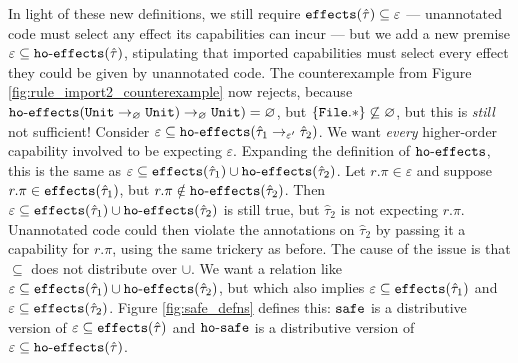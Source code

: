 In light of these new definitions, we still require $\mathtt{effects}(\hat \tau) \subseteq \varepsilon$ --- unannotated code must select any effect its capabilities can incur --- but we add a new premise $\varepsilon \subseteq \mathtt{ho \hbox{-} effects}(\hat \tau)$, stipulating that imported capabilities must select every effect they could be given by unannotated code. The counterexample from Figure \ref{fig:rule_import2_counterexample} now rejects, because $\mathtt{ho \hbox{-} effects}(\mathtt{Unit} \rightarrow_{\varnothing} \mathtt{Unit}) \rightarrow_{\varnothing} \mathtt{Unit}) = \varnothing$, but $\{ \mathtt{File.*} \} \not\subseteq \varnothing$, but this is \textit{still} not sufficient! Consider $\varepsilon \subseteq \mathtt{ho \hbox{-} effects}( \hat \tau_1 \rightarrow_{\varepsilon'} \hat \tau_2 )$. We want \textit{every} higher-order capability involved to be expecting $\varepsilon$. Expanding the definition of $\mathtt{ho \hbox{-} effects}$, this is the same as $\varepsilon \subseteq \mathtt{effects}(\hat \tau_1) \cup \mathtt{ho \hbox{-} effects}(\hat \tau_2)$. Let $r.\pi \in \varepsilon$ and suppose $r.\pi \in \mathtt{effects}(\hat \tau_1)$, but $r.\pi \notin \mathtt{ho \hbox{-} effects}(\hat \tau_2)$. Then $\varepsilon \subseteq \mathtt{effects}(\hat \tau_1) \cup \mathtt{ho \hbox{-} effects}(\hat \tau_2)$ is still true, but $\hat \tau_2$ is not expecting $r.\pi$. Unannotated code could then violate the annotations on $\hat \tau_2$ by passing it a capability for $r.\pi$, using the same trickery as before. The cause of the issue is that $\subseteq$ does not distribute over $\cup$. We want a relation like $\varepsilon \subseteq \mathtt{effects}(\hat \tau_1) \cup \mathtt{ho \hbox{-} effects}(\hat \tau_2)$, but which also implies $\varepsilon \subseteq \mathtt{effects}(\hat \tau_1)$ and $\varepsilon \subseteq \mathtt{effects}(\hat \tau_2)$. Figure \ref{fig:safe_defns} defines this: $\mathtt{safe}$ is a distributive version of $\varepsilon \subseteq \mathtt{effects}(\hat \tau)$ and $\mathtt{ho \hbox{-} safe}$ is a distributive version of $\varepsilon \subseteq \mathtt{ho \hbox{-} effects}(\hat \tau)$.


